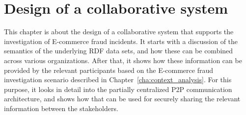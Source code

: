 
\chapter{Design of a collaborative system} %
\label{cha:system_design}

This chapter is about the design of a collaborative system that supports the investigation of \gls{E-commerce} fraud incidents. It starts with a discussion of the semantics of the underlying \gls{RDF} data sets, and how these can be combined across various organizations. After that, it shows how these information can be provided by the relevant participants based on the \gls{E-commerce} fraud investigation scenario described in Chapter~\ref{cha:context_analysis}. For this purpose, it looks in detail into the partially centralized \gls{P2P} communication architecture, and shows how that can be used for securely sharing the relevant information between the stakeholders.







